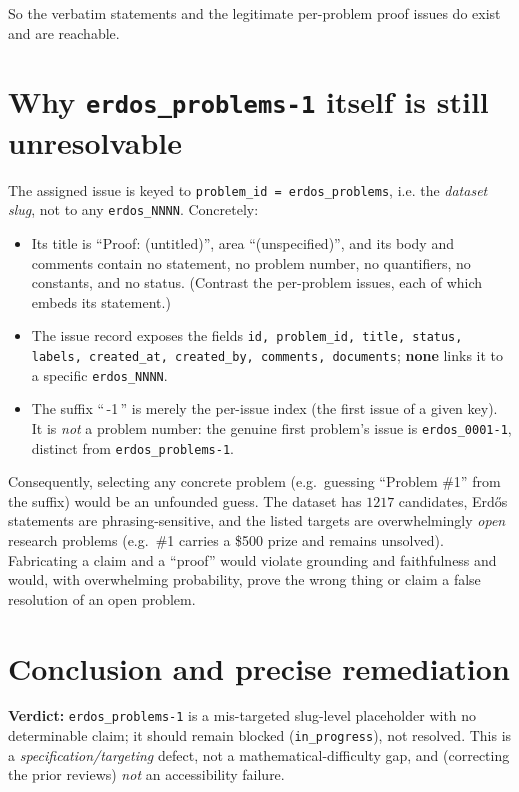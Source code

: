\documentclass[12pt]{article}
\begin{document}
So the verbatim statements and the legitimate per-problem proof issues do exist
and are reachable.

\section*{Why \texttt{erdos\_problems-1} itself is still unresolvable}

The assigned issue is keyed to \texttt{problem\_id = erdos\_problems}, i.e. the
\emph{dataset slug}, not to any \texttt{erdos\_NNNN}. Concretely:

\begin{itemize}
\item Its title is ``Proof: (untitled)'', area ``(unspecified)'', and its body
and comments contain no statement, no problem number, no quantifiers, no
constants, and no status. (Contrast the per-problem issues, each of which embeds
its statement.)
\item The issue record exposes the fields
\texttt{id, problem\_id, title, status, labels, created\_at, created\_by,
comments, documents}; \textbf{none} links it to a specific \texttt{erdos\_NNNN}.
\item The suffix ``\,-1\,'' is merely the per-issue index (the first issue of a
given key). It is \emph{not} a problem number: the genuine first problem's issue
is \texttt{erdos\_0001-1}, distinct from \texttt{erdos\_problems-1}.
\end{itemize}

Consequently, selecting any concrete problem (e.g.\ guessing ``Problem \#1''
from the suffix) would be an unfounded guess. The dataset has $1217$ candidates,
Erd\H{o}s statements are phrasing-sensitive, and the listed targets are
overwhelmingly \emph{open} research problems (e.g.\ \#1 carries a \$500 prize and
remains unsolved). Fabricating a claim and a ``proof'' would violate grounding
and faithfulness and would, with overwhelming probability, prove the wrong
thing or claim a false resolution of an open problem.

\section*{Conclusion and precise remediation}

\textbf{Verdict:} \texttt{erdos\_problems-1} is a mis-targeted slug-level
placeholder with no determinable claim; it should remain blocked
(\texttt{in\_progress}), not resolved. This is a \emph{specification/targeting}
defect, not a mathematical-difficulty gap, and (correcting the prior reviews)
\emph{not} an accessibility failure.
\end{document}
